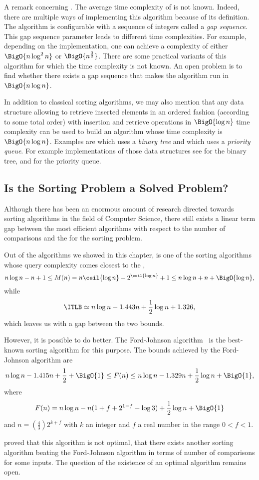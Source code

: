 A remark concerning \shellsort. The average time complexity of \shellsort is not
known. Indeed, there are multiple ways of implementing this
algorithm because of its definition. The \shellsort algorithm is configurable
with a sequence of integers called a \emph{gap sequence}. This gap sequence
parameter leads to different time complexities. For example, depending on the
implementation, one can achieve a complexity of either $\BigO{n \log^2 n}$ or
$\BigO{n^{\frac{3}{2}}}$. There are some practical variants of this algorithm
for which the time complexity is not known. An open problem is to find whether
there exists a gap sequence that makes the algorithm run in $\BigO{n \log
n}$.

In addition to classical sorting algorithms, we may also mention that any data
structure allowing to retrieve inserted elements in an ordered fashion
(according to some total order) with insertion and retrieve operations in
$\BigO{\log n}$ time complexity can be used to build an algorithm whose time
complexity is $\BigO{n \log n}$. Examples are
\binarytreesort which uses a \emph{binary tree} and
\tournamentsort which uses a \emph{priority queue}.
For example implementations of those data structures see
\citet*{sleator:1985} for the binary tree, and
\citet*{leiserson:2001} for the priority queue.


\subsection{Is the Sorting Problem a Solved Problem?}
Although there has been an enormous amount of research directed towards sorting
algorithms in the field of Computer Science, there still exists a linear term
gap between the most efficient algorithms with respect to the number of
comparisons and the \concept{\ITLB} for the sorting problem.

Out of the algorithms we showed in this chapter, \mergesort is one of the
sorting algorithms whose query complexity comes closest
to the \concept{\ITLB}, \ie
\begin{displaymath}
n \log n - n + 1 \le M(n) = n \ceil{\log n} - 2^{\ceil{\log n}} + 1 \le n \log
n + n + \BigO{\log n},
\end{displaymath}
while
\begin{displaymath}
\ITLB \simeq n \log n - 1.443 n + \frac{1}{2} \log n + 1.326,
\end{displaymath}
which leaves us with a  gap between the two bounds.

However, it is possible to do better. The Ford-Johnson
algorithm~\cite{ford:1959,hwang:1969,knuth1998art} is the
best-known sorting algorithm for this purpose. The bounds achieved by the
Ford-Johnson algorithm are
\begin{displaymath}
n \log n - 1.415 n + \frac{1}{2} + \BigO{1} \le F(n) \le n \log n - 1.329 n +
\frac{1}{2} \log n + \BigO{1},
\end{displaymath}
where
\begin{displaymath}
F(n) = n \log n - n ( 1 + f + 2^{1-f} - \log 3) + \frac{1}{2} \log n + \BigO{1}
\end{displaymath}
and \(n = \left(\frac{4}{3}\right) 2^{k+f}\) with \(k\) an integer and \(f\) a real
number in the range \(0 < f < 1\).

\citet*{manacher:1979} proved that this algorithm is not optimal, \ie that
there exists another sorting algorithm beating the Ford-Johnson algorithm in
terms of number of comparisons for some inputs. The question of the existence
of an optimal algorithm remains open.
